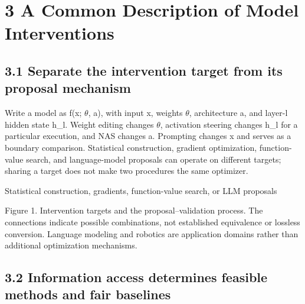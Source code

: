 \section*{3 A Common Description of Model Interventions}

\subsection*{3.1 Separate the intervention target from its proposal mechanism}

Write a model as f(x; \ensuremath{\theta}, a), with input x, weights \ensuremath{\theta}, architecture a, and layer-l hidden state h\_l. Weight editing changes \ensuremath{\theta}, activation steering changes h\_l for a particular execution, and NAS changes a. Prompting changes x and serves as a boundary comparison. Statistical construction, gradient optimization, function-value search, and language-model proposals can operate on different targets; sharing a target does not make two procedures the same optimizer.\cite{r1,r51,r86,r131}


\begin{center}\par\small Statistical construction, gradients, function-value search, or LLM proposals\end{center}

Figure 1. Intervention targets and the proposal–validation process. The connections indicate possible combinations, not established equivalence or lossless conversion. Language modeling and robotics are application domains rather than additional optimization mechanisms.


\subsection*{3.2 Information access determines feasible methods and fair baselines}

